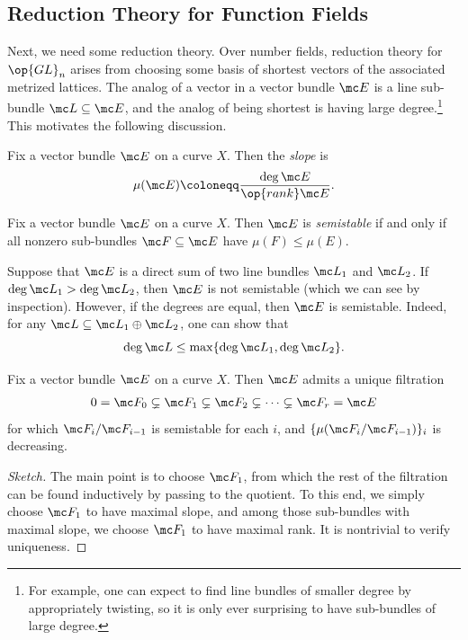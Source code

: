 \documentclass[../notes.tex]{subfiles}
\begin{document}
\subsection{Reduction Theory for Function Fields}
Next, we need some reduction theory. Over number fields, reduction theory for $\op{GL}_n$ arises from choosing some basis of shortest vectors of the associated metrized lattices. The analog of a vector in a vector bundle $\mc E$ is a line sub-bundle $\mc L\subseteq\mc E$, and the analog of being shortest is having large degree.\footnote{For example, one can expect to find line bundles of smaller degree by appropriately twisting, so it is only ever surprising to have sub-bundles of large degree.} This motivates the following discussion.
\begin{definition}[slope]
	Fix a vector bundle $\mc E$ on a curve $X$. Then the \textit{slope} is
	\[\mu(\mc E)\coloneqq\frac{\deg\mc E}{\op{rank}\mc E}.\]
\end{definition}
\begin{definition}[semistable]
	Fix a vector bundle $\mc E$ on a curve $X$. Then $\mc E$ is \textit{semistable} if and only if all nonzero sub-bundles $\mc F\subseteq\mc E$ have $\mu(F)\le\mu(E)$.
\end{definition}
\begin{example}
	Suppose that $\mc E$ is a direct sum of two line bundles $\mc L_1$ and $\mc L_2$. If $\deg\mc L_1>\deg\mc L_2$, then $\mc E$ is not semistable (which we can see by inspection). However, if the degrees are equal, then $\mc E$ is semistable. Indeed, for any $\mc L\subseteq\mc L_1\oplus\mc L_2$, one can show that
	\[\deg\mc L\le\max\{\deg\mc L_1,\deg\mc L_2\}.\]
\end{example}
\begin{theorem}
	Fix a vector bundle $\mc E$ on a curve $X$. Then $\mc E$ admits a unique filtration
	\[0=\mc F_0\subsetneq\mc F_1\subsetneq\mc F_2\subsetneq\cdots\subsetneq \mc F_r=\mc E\]
	for which $\mc F_i/\mc F_{i-1}$ is semistable for each $i$, and $\{\mu(\mc F_i/\mc F_{i-1})\}_i$ is decreasing.
\end{theorem}
\begin{proof}[Sketch]
	The main point is to choose $\mc F_1$, from which the rest of the filtration can be found inductively by passing to the quotient. To this end, we simply choose $\mc F_1$ to have maximal slope, and among those sub-bundles with maximal slope, we choose $\mc F_1$ to have maximal rank. It is nontrivial to verify uniqueness.
\end{proof}
\end{document}
